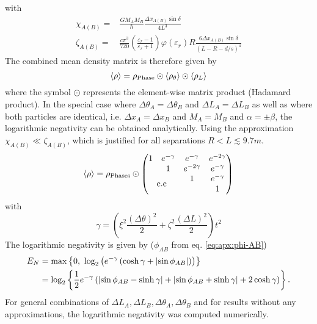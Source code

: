 with 
\begin{align}
  \chi_{A(B)} =& \frac{G M_A M_B}{\hbar}\frac{\Delta x_{A(B)}\sin\delta}{4L^3} \\ \label{eq:apx:definition-zeta}
  \zeta_{A(B)} =& \frac{c\pi^3}{720}\left(\frac{\varepsilon_r - 1}{\varepsilon_r + 1}\right)\varphi(\varepsilon_r) R \frac{6\Delta x_{A(B)} \sin\delta}{(L-R-d/s)^4}
\end{align}
The combined mean density matrix is therefore given by
\begin{equation}
  \left\langle\rho\right\rangle = \rho_\mathrm{Phase} \odot \left\langle\rho_{\theta}\right\rangle \odot \left\langle\rho_{L}\right\rangle
\end{equation}
where the symbol $\odot$ represents the element-wise matrix product (Hadamard product).
In the special case where $\Delta \theta_A = \Delta \theta_B$ and $\Delta L_A = \Delta L_B$ as well as where both particles are identical, i.e. $\Delta x_A = \Delta x_B$ and $M_A=M_B$ and $\alpha=\pm\beta$, the logarithmic negativity can be obtained analytically.
Using the approximation $\chi_{A(B)} \ll \zeta_{A(B)}$, which is justified for all separations $R < L \lesssim 9.7 \si{m}$.
\begin{equation}
  \mean{\rho} = \rho_\mathrm{Phases} \odot \begin{pmatrix}
    1 & e^{-\gamma} & e^{-\gamma} & e^{-2\gamma} \\
    & 1 & e^{-2\gamma} & e^{-\gamma} \\
    \multicolumn{2}{c}{\multirow{2}{*}{c.c}} & 1 & e^{-\gamma} \\
    & & & 1
  \end{pmatrix}
\end{equation}
with 
\begin{equation}\label{eq:apx:stochastic-decoherence}
  \gamma = \left( \xi^2 \frac{(\Delta \theta)^2}{2} + \zeta^2 \frac{(\Delta L)^2}{2} \right) t^2
\end{equation}
The logarithmic negativity is given by ($\phi_{AB}$ from eq. \eqref{eq:apx:phi-AB})
\begin{align}\label{eq:apx:stochastic-variations-logarithmic-negativity}
  E_N &= \max\left\{0,\ \log_2\left(e^{-\gamma}\left(\cosh\gamma + \left\lvert\sin\phi_{AB}\right\rvert\right)\right)\right\} \\
  &= \log_2\left\{ \frac{1}{2} e^{-\gamma} \left(\left\lvert\sin\phi_{AB}-\sinh\gamma\right\rvert + \left\lvert\sin\phi_{AB}+\sinh\gamma\right\rvert + 2\cosh\gamma\right) \right\} .
\end{align}
For general combinations of $\Delta L_A, \Delta L_B, \Delta \theta_A, \Delta \theta_B$ and for results without any approximations, the logarithmic negativity was computed numerically. 




